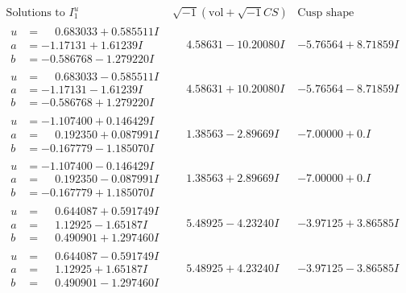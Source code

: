 \documentclass[1p]{elsarticle_modified}
\theoremstyle{definition}
\newcommand{\I}{\sqrt{-1}}
\begin{document}
$$\begin{array}{c|c|c}  
\text{Solutions to }I^u_{1}& \I (\text{vol} + \sqrt{-1}CS) & \text{Cusp shape}\\
 \hline 
\begin{aligned}
u &= \phantom{-}0.683033 + 0.585511 I \\
a &= -1.17131 + 1.61239 I \\
b &= -0.586768 - 1.279220 I\end{aligned}
 & \phantom{-}4.58631 - 10.20080 I & -5.76564 + 8.71859 I \\ \hline\begin{aligned}
u &= \phantom{-}0.683033 - 0.585511 I \\
a &= -1.17131 - 1.61239 I \\
b &= -0.586768 + 1.279220 I\end{aligned}
 & \phantom{-}4.58631 + 10.20080 I & -5.76564 - 8.71859 I \\ \hline\begin{aligned}
u &= -1.107400 + 0.146429 I \\
a &= \phantom{-}0.192350 + 0.087991 I \\
b &= -0.167779 - 1.185070 I\end{aligned}
 & \phantom{-}1.38563 - 2.89669 I & -7.00000 + 0. I\phantom{ +0.000000I} \\ \hline\begin{aligned}
u &= -1.107400 - 0.146429 I \\
a &= \phantom{-}0.192350 - 0.087991 I \\
b &= -0.167779 + 1.185070 I\end{aligned}
 & \phantom{-}1.38563 + 2.89669 I & -7.00000 + 0. I\phantom{ +0.000000I} \\ \hline\begin{aligned}
u &= \phantom{-}0.644087 + 0.591749 I \\
a &= \phantom{-}1.12925 - 1.65187 I \\
b &= \phantom{-}0.490901 + 1.297460 I\end{aligned}
 & \phantom{-}5.48925 - 4.23240 I & -3.97125 + 3.86585 I \\ \hline\begin{aligned}
u &= \phantom{-}0.644087 - 0.591749 I \\
a &= \phantom{-}1.12925 + 1.65187 I \\
b &= \phantom{-}0.490901 - 1.297460 I\end{aligned}
 & \phantom{-}5.48925 + 4.23240 I & -3.97125 - 3.86585 I \\ \hline\begin{aligned}

\end{aligned}
\end{array}$$
\end{document}
